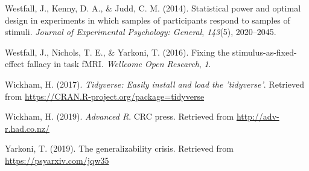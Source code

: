\documentclass[
  english,
  doc,floatsintext]{apa6}
\begin{document}
\leavevmode\hypertarget{ref-westfall_2014}{}%
Westfall, J., Kenny, D. A., \& Judd, C. M. (2014). Statistical power and optimal design in experiments in which samples of participants respond to samples of stimuli. \emph{Journal of Experimental Psychology: General}, \emph{143}(5), 2020--2045.

\leavevmode\hypertarget{ref-westfall_yarkoni_2016}{}%
Westfall, J., Nichols, T. E., \& Yarkoni, T. (2016). Fixing the stimulus-as-fixed-effect fallacy in task fMRI. \emph{Wellcome Open Research}, \emph{1}.

\leavevmode\hypertarget{ref-R-tidyverse}{}%
Wickham, H. (2017). \emph{Tidyverse: Easily install and load the 'tidyverse'}. Retrieved from \url{https://CRAN.R-project.org/package=tidyverse}

\leavevmode\hypertarget{ref-wickham-advr}{}%
Wickham, H. (2019). \emph{Advanced R}. CRC press. Retrieved from \url{http://adv-r.had.co.nz/}

\leavevmode\hypertarget{ref-yarkoni-GC}{}%
Yarkoni, T. (2019). The generalizability crisis. Retrieved from \url{https://psyarxiv.com/jqw35}

\endgroup
\end{document}
